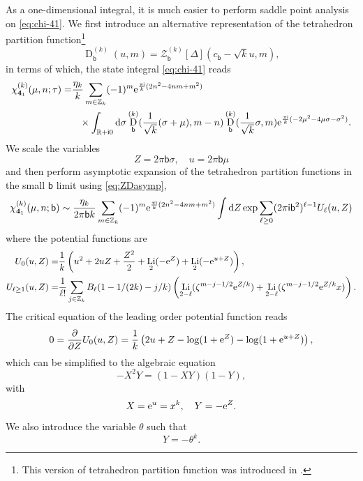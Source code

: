 \documentclass[a4paper,11pt]{article}	%
\DeclareMathOperator{\Li}{Li}
\def\mc{\mathcal}
\def\md{\mathbf}
\def\ms{\mathsf}
\def\IR{\mathbb{R}}
\def\IZ{\mathbb{Z}}
\newcommand{\pd}{\partial}
\newcommand{\re}{{\rm e}}
\newcommand{\ri}{{\mathsf{i}}}
\newcommand{\rd}{{\rm d}}
\newcommand{\nn}{\nonumber \\}
\newcommand{\bb}{\ms{b}}
\newcommand{\knot}[1]{\md{#1}}
\DeclareMathOperator{\DD}{\text{D}}
\begin{document}
As a one-dimensional integral, it is much easier to perform saddle
point analysis on \eqref{eq:chi-41}.  We first introduce an
alternative representation of the tetrahedron partition
function\footnote{This version of tetrahedron partition function was
  introduced in \cite{Andersen:2016ugz}.}
\begin{equation}
  \DD_\bb^{(k)}(u,m) = \mc{Z}_\bb^{(k)}[\Delta](c_\bb-\sqrt{k}u,m),
  \label{eq:Dk}
\end{equation}
in terms of which, the state integral \eqref{eq:chi-41} reads
\begin{align}
  \chi^{(k)}_{\knot{4}_1}(\mu,n;\tau) =
  &\frac{\eta_k}{k}\sum_{m\in \IZ_k}
    (-1)^m \re^{\frac{\pi\ri}{k}(2n^2-4nm+m^2)}
    \nn
  &\phantom{=}\times
    \int_{\IR+\ri 0}\rd \sigma
    \DD^{(k)}_\bb(\frac{1}{\sqrt{k}}(\sigma+\mu),m-n)
    \DD^{(k)}_\bb(\frac{1}{\sqrt{k}}\sigma,m)
    \re^{\frac{\pi\ri}{k}(-2\mu^2-4\mu\sigma-\sigma^2)}.
\end{align}
%
We scale the variables
\begin{equation}
  Z = 2\pi\bb \sigma,\quad u =2\pi\bb \mu
\end{equation}
and then perform asymptotic expansion of the tetrahedron partition
functions in the small $\bb$ limit using \eqref{eq:ZDasymp},
\begin{equation}
  \chi_{\knot{4}_1}^{(k)}(\mu,n;\bb) \sim
  \frac{\eta_k}{2\pi\bb k}\sum_{m\in\IZ_k}
  (-1)^m \re^{\frac{\pi\ri}{k}(2n^2-4nm+m^2)}
  \int \rd Z \exp\sum_{\ell\geq 0}(2\pi\ri\bb^2)^{\ell-1} U_\ell(u,Z)
\end{equation}
where the potential functions are
\begin{subequations}
  \begin{align}
    U_0(u,Z) =
    &\frac{1}{k}\left(
    u^2+2uZ +\frac{Z^2}{2} + 
    \Li_2(-\re^{Z}) + \Li_2(-\re^{u+Z})\right),\\
    U_{\ell\geq 1}(u,Z) =
    &\frac{1}{\ell!}\sum_{j\in\IZ_k}
      B_\ell(1-1/(2k)-j/k)
      \left(
      \Li_{2-\ell}(\zeta^{m-j-1/2} \re^{Z/k})
      +\Li_{2-\ell}(\zeta^{m-j-1/2}\re^{Z/k}x)
      \right).
  \end{align}
\end{subequations}
The critical equation of the leading order potential function reads
\begin{equation}
  0 = \frac{\pd}{\pd Z}U_0(u,Z) = \frac{1}{k}\left(2u+Z -\log(1+\re^{Z})
    -\log(1+\re^{u+Z})\right),
\end{equation}
which can be simplified to the algebraic equation
\begin{equation}
  -X^2 Y = (1-XY)(1-Y),
  \label{eq:alcr.41}
\end{equation}
with
\begin{equation}
  X = \re^u = x^k,\quad Y = -\re^{Z}.
\end{equation}
We also introduce the variable $\theta$ such that
\begin{equation}
  Y = -\theta^k.
\end{equation}
\end{document}
